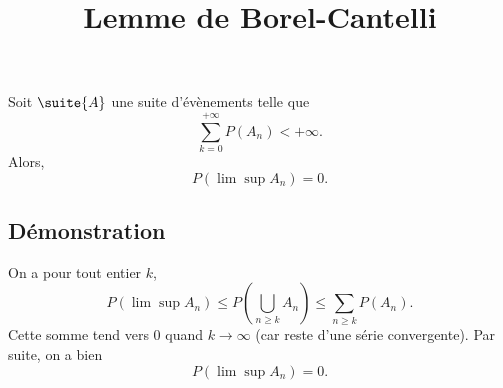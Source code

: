 \documentclass[fontsize=12pt,twoside=false,parskip=half]{scrartcl}
\title{Lemme de Borel-Cantelli}
\date{}
\author{}
\begin{document}
\maketitle
   \begin{Theoreme}
      Soit $\suite{A}$ une suite d’évènements telle que
      \[
         \sum_{k = 0}^{+\infty}P(A_n) < + \infty.
      \]
      Alors,
      \[
         P\left(\lim \sup A_n\right) = 0.
      \]
   \end{Theoreme}
   \subsection{Démonstration}
      On a pour tout entier $k$,
      \[
         P\left(\lim \sup A_n\right) \leq P\left(\bigcup_{n \geq k} A_n\right) \leq \sum_{n \geq k} P(A_n). 
      \]
      Cette somme tend vers $0$ quand $k \to \infty$ (car reste d’une série convergente). Par suite, on a bien
      \[
          P(\lim \sup A_n) = 0.
      \]
\end{document}
